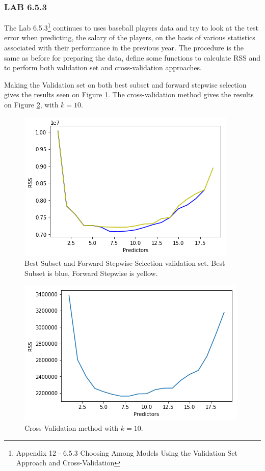 \subsubsection*{LAB 6.5.3}
The Lab 6.5.3\footnote{Appendix 12 - 6.5.3 Choosing Among Models Using the Validation Set Approach and Cross-Validation} continues to uses baseball players data and try to look at the test error when predicting, the salary of the players, on the basis of various statistics associated with their performance in the previous year. The procedure is the same as before for preparing the data, define some functions to calculate RSS and to perform both validation set and cross-validation approaches.

Making the Validation set on both best subset and forward stepwise selection gives the results seen on Figure \ref{fig:validatedBestSubsetAndForwardStepwise}. The cross-validation method gives the results on Figure \ref{fig:crossValidationRSS}, with $k=10$.

\begin{figure}[h]
	\centering
	\includegraphics[scale=0.4]{subsetSelection/modelQualification/fig/validatedBestSubsetAndForwardStepwise.png}
	\caption{Best Subset and Forward Stepwise Selection validation set. Best Subset is blue, Forward Stepwise is yellow.}
	\label{fig:validatedBestSubsetAndForwardStepwise}
\end{figure}

\begin{figure}[h]
	\centering
	\includegraphics[scale=0.4]{subsetSelection/modelQualification/fig/crossValidation.png}
	\caption{Cross-Validation method with $k=10$.}
	\label{fig:crossValidationRSS}
\end{figure}
